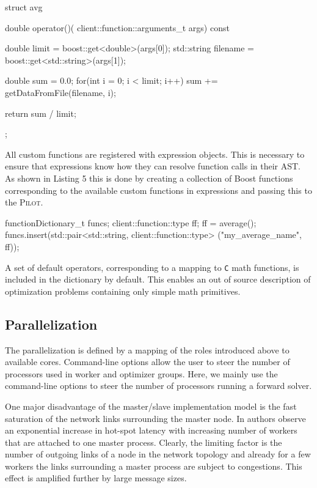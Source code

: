 \documentclass[preprint,linenumbers,amsmath,amssymb,aps,prstab]{revtex4-1}%
\begin{document}
\begin{code}
struct avg {

    double operator()(
      client::function::arguments_t args) const {

        double limit = boost::get<double>(args[0]);
        std::string filename =
          boost::get<std::string>(args[1]);

        double sum = 0.0;
        for(int i = 0; i < limit; i++)
            sum += getDataFromFile(filename, i);

        return sum / limit;
    }
};
\end{code}

All custom functions are registered with expression objects.
This is necessary to ensure that expressions know how they can resolve
  function calls in their AST.
As shown in Listing 5 this is done by creating a collection of Boost
  functions~\cite{boost3} corresponding to the
  available custom functions in expressions and passing this to the
  \textsc{Pilot}.

\begin{code}
functionDictionary_t funcs;
client::function::type ff;
ff = average();
funcs.insert(std::pair<std::string, 
		client::function::type> 
       		("my_average_name", ff));
\end{code}

A set of default operators, corresponding to a mapping to \texttt{C} math
  functions, is included in the dictionary by default.
This enables an out of source description of optimization problems containing
  only simple math primitives.


\subsection{Parallelization} \label{sec:parallelization}

The parallelization is defined by a mapping of the roles introduced above to
  available cores.
Command-line options allow the user to steer the number of processors used in
  worker and optimizer groups.
Here, we mainly use the command-line options to steer the number of processors
  running a forward solver.

One major disadvantage of the master/slave implementation model is the fast
  saturation of the network links surrounding the master node.
In \cite{bctg:09} authors observe an exponential increase in hot-spot latency
  with increasing number of workers that are attached to one master process.
Clearly, the limiting factor is the number of outgoing links of a node in the
  network topology and already for a few workers the links surrounding a
  master process are subject to congestions.
This effect is amplified further by large message sizes.
\end{document}
